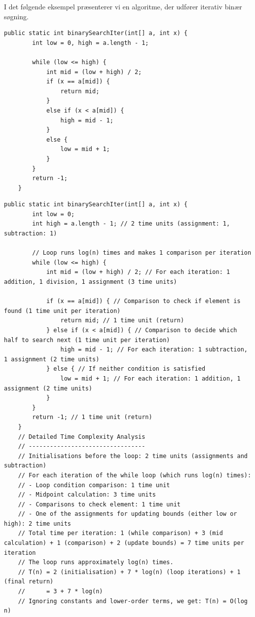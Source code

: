 \begin{example}

I det følgende eksempel præsenterer vi en algoritme, der udfører iterativ binær søgning.

\begin{lstlisting}[style = javaStyle, caption={Iterativ binær søgning}, label={lst:java_binary_search_none}]
    public static int binarySearchIter(int[] a, int x) {
        int low = 0, high = a.length - 1;

        while (low <= high) {
            int mid = (low + high) / 2;
            if (x == a[mid]) {
                return mid;
            } 
            else if (x < a[mid]) {
                high = mid - 1;
            } 
            else {
                low = mid + 1;
            }
        }
        return -1;
    }
\end{lstlisting}

\begin{lstlisting}[style=javaStyle, caption={Iterativ binær søgning}, label={lst:java_binary_search}]
    public static int binarySearchIter(int[] a, int x) {
        int low = 0;
        int high = a.length - 1; // 2 time units (assignment: 1, subtraction: 1)

        // Loop runs log(n) times and makes 1 comparison per iteration
        while (low <= high) {
            int mid = (low + high) / 2; // For each iteration: 1 addition, 1 division, 1 assignment (3 time units)

            if (x == a[mid]) { // Comparison to check if element is found (1 time unit per iteration)
                return mid; // 1 time unit (return)
            } else if (x < a[mid]) { // Comparison to decide which half to search next (1 time unit per iteration)
                high = mid - 1; // For each iteration: 1 subtraction, 1 assignment (2 time units)
            } else { // If neither condition is satisfied
                low = mid + 1; // For each iteration: 1 addition, 1 assignment (2 time units)
            }
        }
        return -1; // 1 time unit (return)
    }
    // Detailed Time Complexity Analysis
    // ---------------------------------
    // Initialisations before the loop: 2 time units (assignments and subtraction)
    // For each iteration of the while loop (which runs log(n) times):
    // - Loop condition comparison: 1 time unit
    // - Midpoint calculation: 3 time units
    // - Comparisons to check element: 1 time unit
    // - One of the assignments for updating bounds (either low or high): 2 time units
    // Total time per iteration: 1 (while comparison) + 3 (mid calculation) + 1 (comparison) + 2 (update bounds) = 7 time units per iteration
    // The loop runs approximately log(n) times.
    // T(n) = 2 (initialisation) + 7 * log(n) (loop iterations) + 1 (final return)
    //      = 3 + 7 * log(n)
    // Ignoring constants and lower-order terms, we get: T(n) = O(log n)

\end{lstlisting}
    
\end{example}

